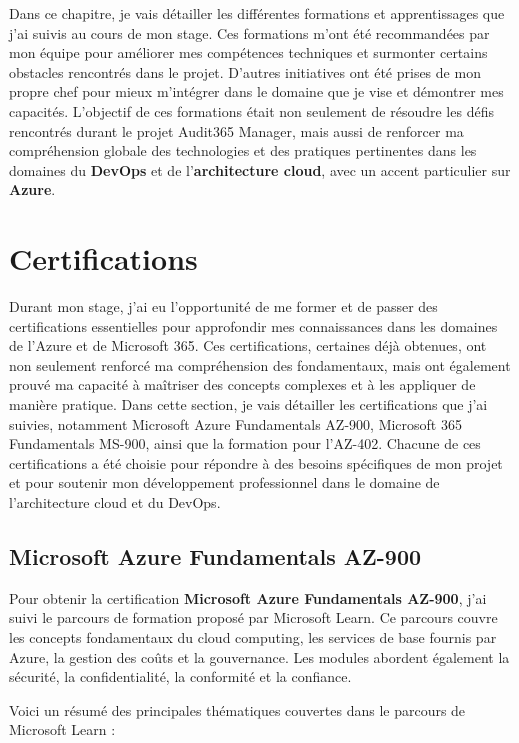 Dans ce chapitre, je vais détailler les différentes formations et apprentissages que j'ai suivis au cours de mon stage. Ces formations m'ont été recommandées par mon équipe pour améliorer mes compétences techniques et surmonter certains obstacles rencontrés dans le projet. D'autres initiatives ont été prises de mon propre chef pour mieux m'intégrer dans le domaine que je vise et démontrer mes capacités. L'objectif de ces formations était non seulement de résoudre les défis rencontrés durant le projet Audit365 Manager, mais aussi de renforcer ma compréhension globale des technologies et des pratiques pertinentes dans les domaines du \textbf{DevOps} et de l'\textbf{architecture cloud}, avec un accent particulier sur \textbf{Azure}.

\section{Certifications}

Durant mon stage, j'ai eu l'opportunité de me former et de passer des certifications essentielles pour approfondir mes connaissances dans les domaines de l'Azure et de Microsoft 365. Ces certifications, certaines déjà obtenues, ont non seulement renforcé ma compréhension des fondamentaux, mais ont également prouvé ma capacité à maîtriser des concepts complexes et à les appliquer de manière pratique. Dans cette section, je vais détailler les certifications que j'ai suivies, notamment Microsoft Azure Fundamentals AZ-900, Microsoft 365 Fundamentals MS-900, ainsi que la formation pour l'AZ-402. Chacune de ces certifications a été choisie pour répondre à des besoins spécifiques de mon projet et pour soutenir mon développement professionnel dans le domaine de l'architecture cloud et du DevOps.

\subsection{Microsoft Azure Fundamentals AZ-900}

Pour obtenir la certification \textbf{Microsoft Azure Fundamentals AZ-900}, j'ai suivi le parcours de formation proposé par Microsoft Learn. Ce parcours couvre les concepts fondamentaux du cloud computing, les services de base fournis par Azure, la gestion des coûts et la gouvernance. Les modules abordent également la sécurité, la confidentialité, la conformité et la confiance.

Voici un résumé des principales thématiques couvertes dans le parcours de Microsoft Learn :

